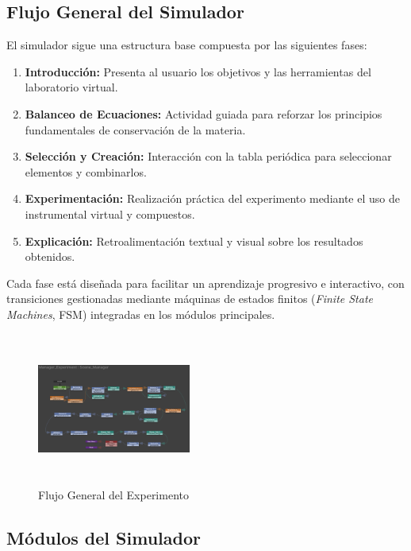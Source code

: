 \documentclass[conference]{IEEEtran}
\begin{document}
\subsection{Flujo General del Simulador}

El simulador sigue una estructura base compuesta por las siguientes fases:
\begin{enumerate}
    \item \textbf{Introducción:} Presenta al usuario los objetivos y las herramientas del laboratorio virtual.
    \item \textbf{Balanceo de Ecuaciones:} Actividad guiada para reforzar los principios fundamentales de conservación de la materia.
    \item \textbf{Selección y Creación:} Interacción con la tabla periódica para seleccionar elementos y combinarlos.
    \item \textbf{Experimentación:} Realización práctica del experimento mediante el uso de instrumental virtual y compuestos.
    \item \textbf{Explicación:} Retroalimentación textual y visual sobre los resultados obtenidos.
\end{enumerate}

Cada fase está diseñada para facilitar un aprendizaje progresivo e interactivo, con transiciones gestionadas mediante máquinas de estados finitos (\textit{Finite State Machines}, FSM) integradas en los módulos principales.

\begin{figure}[thbp]
    \centering
    \includegraphics[width=0.45\textwidth, height = 5cm]{img/Experimento_01.png}
    \caption{Flujo General del Experimento}
    \label{fig:Flujo General del Experimento}
\end{figure}

\subsection{Módulos del Simulador}
\end{document}
